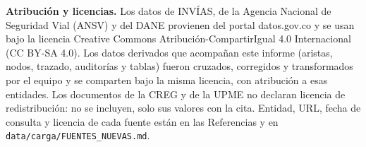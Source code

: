 \documentclass[12pt,a4paper]{article}
\begin{document}
\renewcommand{\refname}{Referencias}

\noindent\textbf{Atribución y licencias.} Los datos de INVÍAS, de la
Agencia Nacional de Seguridad Vial (ANSV) y del DANE provienen del portal
datos.gov.co y se usan bajo la licencia Creative Commons
Atribución-CompartirIgual 4.0 Internacional (CC BY-SA 4.0). Los datos
derivados que acompañan este informe (aristas, nodos, trazado, auditorías y
tablas) fueron cruzados, corregidos y transformados por el equipo y se
comparten bajo la misma licencia, con atribución a esas entidades. Los
documentos de la CREG y de la UPME no declaran licencia de redistribución: no
se incluyen, solo sus valores con la cita. Entidad, URL, fecha de consulta y
licencia de cada fuente están en las Referencias y en
\nolinkurl{data/carga/FUENTES_NUEVAS.md}.
\end{document}
